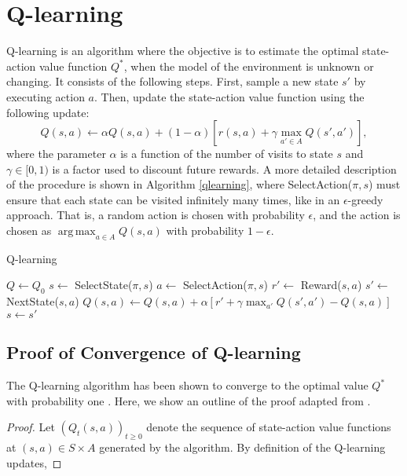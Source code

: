 \documentclass{article} %
\DeclareMathOperator*{\argmax}{arg\,max}
\begin{document}
\section{Q-learning}
Q-learning is an algorithm where the objective is to estimate the optimal state-action value function $Q^*$, when the model of the environment is unknown or changing. It consists of the following steps.  First, sample a new state $s'$ by executing action $a$.  Then, update the state-action value function using the following update:
$$Q(s,a) \leftarrow \alpha Q(s,a) + (1-\alpha)[r(s,a) + \gamma \max_{a' \in A}Q(s', a')],$$
where the parameter $\alpha$ is a function of the number of visits to state $s$ and $\gamma \in [0,1)$ is a factor used to discount future rewards.  A more detailed description of the procedure is shown in Algorithm \ref{qlearning}, where SelectAction($\pi,s$) must ensure that each state can be visited infinitely many times, like in an $\epsilon$-greedy approach.  That is, a random action is chosen with probability $\epsilon$, and the action is chosen as $\argmax_{a\in A} Q(s,a)$ with probability $1-\epsilon$.
\begin{algorithm}
 \caption{Q-learning}\label{euclid}
  \begin{algorithmic}[1]
      \State $Q\gets Q_0$
        \State $s \gets $ SelectState($\pi,s$)
        	\State $a \gets$ SelectAction($\pi,s$)
        	\State $r' \gets$ Reward($s,a$)
        	\State $s' \gets$ NextState($s,a$)
        	\State $Q(s,a) \gets Q(s,a) + \alpha[r' + \gamma\max_{a'}Q(s',a')-Q(s,a)]$
        	\State $s \gets s'$
        \EndFor
      \EndFor
      \State {}
    \EndProcedure
  \end{algorithmic}
  \label{qlearning}
\end{algorithm}

\subsection{Proof of Convergence of Q-learning}
The Q-learning algorithm has been shown to converge to the optimal value $Q^*$ with probability one \cite{mohri}.  Here, we show an outline of the proof adapted from \cite{mohri}.  
\begin{proof}
Let $(Q_t(s,a))_{t\geq 0}$ denote the sequence of state-action value functions at $(s,a) \in S \times A$ generated by the algorithm.  By definition of the Q-learning updates,

\end{proof}
\end{document}
